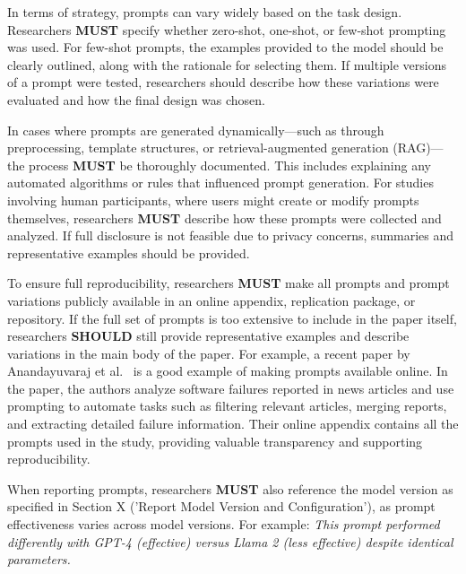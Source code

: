 In terms of strategy, prompts can vary widely based on the task design. Researchers \textbf{MUST} specify whether zero-shot, one-shot, or few-shot prompting was used. For few-shot prompts, the examples provided to the model should be clearly outlined, along with the rationale for selecting them. If multiple versions of a prompt were tested, researchers should describe how these variations were evaluated and how the final design was chosen.

In cases where prompts are generated dynamically—such as through preprocessing, template structures, or retrieval-augmented generation (RAG)—the process \textbf{MUST} be thoroughly documented. This includes explaining any automated algorithms or rules that influenced prompt generation. For studies involving human participants, where users might create or modify prompts themselves, researchers \textbf{MUST} describe how these prompts were collected and analyzed. If full disclosure is not feasible due to privacy concerns, summaries and representative examples should be provided.

To ensure full reproducibility, researchers \textbf{MUST} make all prompts and prompt variations publicly available in an online appendix, replication package, or repository. If the full set of prompts is too extensive to include in the paper itself, researchers \textbf{SHOULD} still provide representative examples and describe variations in the main body of the paper. For example, a recent paper by Anandayuvaraj et al.~\cite{anandayuvaraj2024fail} is a good example of making prompts available online. In the paper, the authors analyze software failures reported in news articles and use prompting to automate tasks such as filtering relevant articles, merging reports, and extracting detailed failure information. Their online appendix contains all the prompts used in the study, providing valuable transparency and supporting reproducibility.

When reporting prompts, researchers \textbf{MUST} also reference the model version as specified in Section X ('Report Model Version and Configuration'), as prompt effectiveness varies across model versions. For example: \textit{This prompt performed differently with GPT-4 (effective) versus Llama 2 (less effective) despite identical parameters.}

